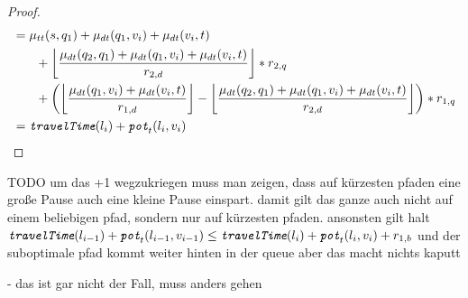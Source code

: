 \begin{proof}
\begin{align}
\begin{split}
			&= \traveltime(s, q_1) + \drivingtime(q_1,v_{i}) + \drivingtime(v_{i},t)\\
			& \phantom{{}=1} + \floor*{ \frac{\drivingtime(q_2,q_1) + \drivingtime(q_1,v_{i}) + \drivingtime(v_{i},t)}{\restr_{2,d}} } * \restr_{2,q}\\
			& \phantom{{}=1} + \left( \floor*{ \frac{\drivingtime(q_1,v_{i})  + \drivingtime(v_{i},t)}{\restr_{1,d}} } - \floor*{ \frac{\drivingtime(q_2,q_1) + \drivingtime(q_1,v_{i}) + \drivingtime(v_{i},t)}{\restr_{2,d}} }\right) * \restr_{1,q}\\
			&= \concretett(l_{i}) + \concretepotential_t(l_{i},v_{i})
		\end{split}
	\end{align}
\end{proof}

TODO um das +1 wegzukriegen muss man zeigen, dass auf kürzesten pfaden eine große Pause auch eine kleine Pause einspart. damit gilt das ganze auch nicht auf einem beliebigen pfad, sondern nur auf kürzesten pfaden. ansonsten gilt halt $\texttt{\itshape travelTime}(l_{i-1}) + \texttt{\itshape pot}_t(l_{i-1},v_{i-1}) \le \texttt{\itshape travelTime}(l_{i}) + \texttt{\itshape pot}_t(l_{i},v_{i}) + r_{1,b}$ und der suboptimale pfad kommt weiter hinten in der queue aber das macht nichts kaputt

- das ist gar nicht der Fall, muss anders gehen



